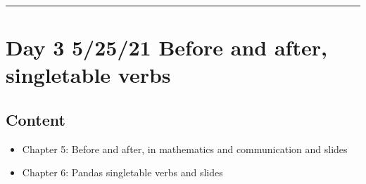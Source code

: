 \documentclass[letterpaper,10pt,english]{jupyterBook}
\begin{document}
\bigskip\hrule\bigskip



\section{Day 3 \sphinxhyphen{} 5/25/21 \sphinxhyphen{} Before and after, single\sphinxhyphen{}table verbs}
\label{\detokenize{course-schedule:day-3-5-25-21-before-and-after-single-table-verbs}}

\subsection{Content}
\label{\detokenize{course-schedule:id3}}\begin{itemize}
\item {} 
\sphinxAtStartPar
Chapter 5: Before and after, in mathematics and communication \sphinxhyphen{} {\hyperref[\detokenize{chapter-5-before-and-after::doc}]{}} and slides

\item {} 
\sphinxAtStartPar
Chapter 6: Pandas single\sphinxhyphen{}table verbs \sphinxhyphen{} {\hyperref[\detokenize{chapter-6-single-table-verbs::doc}]{}} and slides

\end{itemize}
\end{document}

